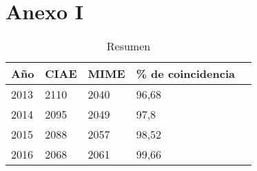 \renewcommand{\appendixname}{Anexos}
\renewcommand{\appendixtocname}{Anexos}
\renewcommand{\appendixpagename}{Anexos}

\appendix
\chapter{Anexo I}

\begin{table}[ht]
\centering
\caption{Resumen }
\label{my-label}
\begin{tabular}{|l|l|l|l|l|}
\hline
Año  & CIAE & MIME & \% de coincidencia   \\ \hline
2013 & 2110 & 2040 & 96,68 \\ \hline
2014 & 2095 & 2049 & 97,8  \\ \hline
2015 & 2088 & 2057 & 98,52 \\ \hline
2016 & 2068 & 2061 & 99,66 \\ \hline
\end{tabular}
\end{table}

